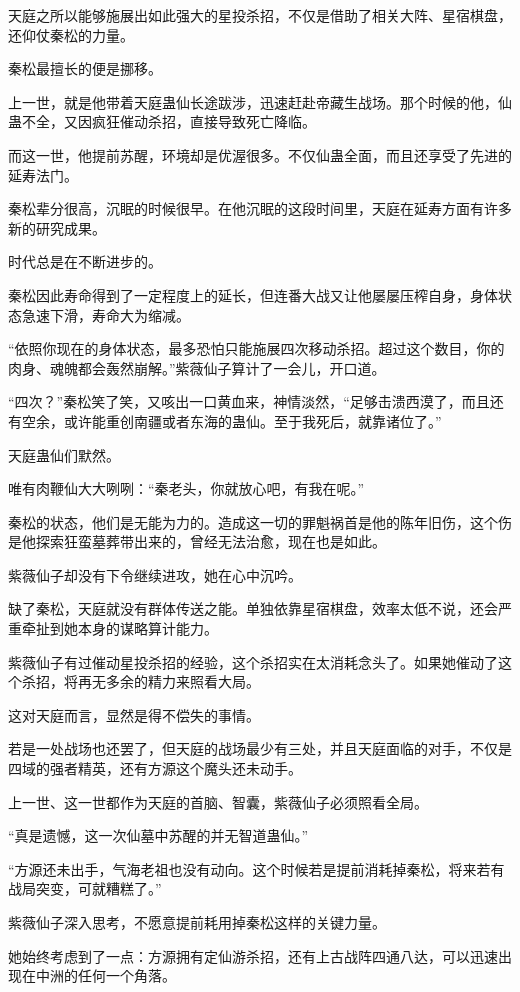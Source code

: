 \begin{this_body}
天庭之所以能够施展出如此强大的星投杀招，不仅是借助了相关大阵、星宿棋盘，还仰仗秦松的力量。

秦松最擅长的便是挪移。

上一世，就是他带着天庭蛊仙长途跋涉，迅速赶赴帝藏生战场。那个时候的他，仙蛊不全，又因疯狂催动杀招，直接导致死亡降临。

而这一世，他提前苏醒，环境却是优渥很多。不仅仙蛊全面，而且还享受了先进的延寿法门。

秦松辈分很高，沉眠的时候很早。在他沉眠的这段时间里，天庭在延寿方面有许多新的研究成果。

时代总是在不断进步的。

秦松因此寿命得到了一定程度上的延长，但连番大战又让他屡屡压榨自身，身体状态急速下滑，寿命大为缩减。

“依照你现在的身体状态，最多恐怕只能施展四次移动杀招。超过这个数目，你的肉身、魂魄都会轰然崩解。”紫薇仙子算计了一会儿，开口道。

“四次？”秦松笑了笑，又咳出一口黄血来，神情淡然，“足够击溃西漠了，而且还有空余，或许能重创南疆或者东海的蛊仙。至于我死后，就靠诸位了。”

天庭蛊仙们默然。

唯有肉鞭仙大大咧咧：“秦老头，你就放心吧，有我在呢。”

秦松的状态，他们是无能为力的。造成这一切的罪魁祸首是他的陈年旧伤，这个伤是他探索狂蛮墓葬带出来的，曾经无法治愈，现在也是如此。

紫薇仙子却没有下令继续进攻，她在心中沉吟。

缺了秦松，天庭就没有群体传送之能。单独依靠星宿棋盘，效率太低不说，还会严重牵扯到她本身的谋略算计能力。

紫薇仙子有过催动星投杀招的经验，这个杀招实在太消耗念头了。如果她催动了这个杀招，将再无多余的精力来照看大局。

这对天庭而言，显然是得不偿失的事情。

若是一处战场也还罢了，但天庭的战场最少有三处，并且天庭面临的对手，不仅是四域的强者精英，还有方源这个魔头还未动手。

上一世、这一世都作为天庭的首脑、智囊，紫薇仙子必须照看全局。

“真是遗憾，这一次仙墓中苏醒的并无智道蛊仙。”

“方源还未出手，气海老祖也没有动向。这个时候若是提前消耗掉秦松，将来若有战局突变，可就糟糕了。”

紫薇仙子深入思考，不愿意提前耗用掉秦松这样的关键力量。

她始终考虑到了一点：方源拥有定仙游杀招，还有上古战阵四通八达，可以迅速出现在中洲的任何一个角落。


\end{this_body}

